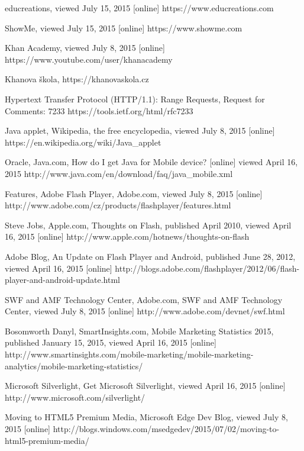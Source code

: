 \begin{thebibliography}{99}
educreations, viewed July 15, 2015 [online]
https://www.educreations.com

ShowMe, viewed July 15, 2015 [online]
https://www.showme.com


Khan Academy, viewed July 8, 2015 [online]
https://www.youtube.com/user/khanacademy

Khanova škola, https://khanovaskola.cz



Hypertext Transfer Protocol (HTTP/1.1): Range Requests, Request for Comments: 7233
https://tools.ietf.org/html/rfc7233


Java applet, Wikipedia, the free encyclopedia, viewed July 8, 2015 [online]
https://en.wikipedia.org/wiki/Java\_applet

Oracle, Java.com, How do I get Java for Mobile device? [online] viewed April 16, 2015
http://www.java.com/en/download/faq/java\_mobile.xml

Features, Adobe Flash Player, Adobe.com, viewed July 8, 2015 [online]
http://www.adobe.com/cz/products/flashplayer/features.html

Steve Jobs, Apple.com, Thoughts on Flash, published April 2010, viewed April 16, 2015 [online]
http://www.apple.com/hotnews/thoughts-on-flash

Adobe Blog, An Update on Flash Player and Android, published June 28, 2012, viewed April 16, 2015 [online]
http://blogs.adobe.com/flashplayer/2012/06/flash-player-and-android-update.html

SWF and AMF Technology Center, Adobe.com, SWF and AMF Technology Center, viewed July 8, 2015 [online]
http://www.adobe.com/devnet/swf.html

Bosomworth Danyl, SmartInsights.com, Mobile Marketing Statistics 2015, published January 15, 2015, viewed April 16, 2015 [online]
http://www.smartinsights.com/mobile-marketing/mobile-marketing-analytics/mobile-marketing-statistics/

Microsoft Silverlight, Get Microsoft Silverlight, viewed April 16, 2015 [online]
http://www.microsoft.com/silverlight/

Moving to HTML5 Premium Media, Microsoft Edge Dev Blog, viewed July 8, 2015 [online]
http://blogs.windows.com/msedgedev/2015/07/02/moving-to-html5-premium-media/


\end{thebibliography}
